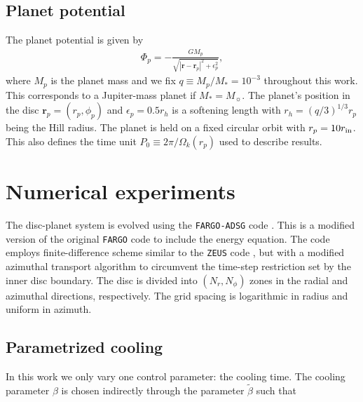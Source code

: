 \subsection{Planet potential}\label{planet_config}
The planet potential is given by 
\begin{align}
\Phi_p = -\frac{GM_p}{\sqrt{|\bm{r} - \bm{r}_p|^2 + \epsilon_p^2}},
\end{align}
where $M_p$ is the planet mass and we fix $q\equiv M_p/M_*=10^{-3}$
throughout this work. This corresponds to a Jupiter-mass planet if $M_*=M_{\sun}$. 
The planet's position in the disc 
 $\bm{r}_p=(r_p,\phi_p)$  and $\epsilon_p=0.5r_h$ is a softening
length with $r_h=(q/3)^{1/3}r_p$ being the Hill radius.  
The planet is held on a fixed circular orbit with $ r_p = 10r_\mathrm{in}$. This also
defines the time unit $P_0\equiv 2\pi/\Omega_k(r_p)$ used to describe results. 


\section{Numerical experiments}\label{method}
The disc-planet system is evolved using the 
\texttt{FARGO-ADSG} code \citep{baruteau08, baruteau08b}. This is a modified version 
of the original \texttt{FARGO} code \citep{masset00a} to include the energy 
equation. The code employs finite-difference scheme similar 
to the \texttt{ZEUS} code \citep{stone92}, but with a modified azimuthal transport 
algorithm to circumvent the time-step restriction set by the inner disc boundary. 
The disc is divided into $(N_r,N_\phi)$ zones in the radial and azimuthal directions, 
respectively. The grid spacing is logarithmic in radius and uniform in azimuth.

\subsection{Parametrized cooling}
In this work we only vary one control parameter: the cooling
time. 
The cooling parameter $\beta$ is chosen indirectly  through the parameter
$\tilde{\beta}$ such that 

